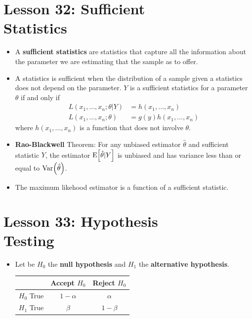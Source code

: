 \documentclass[10pt, french]{article}
\begin{document}
\begin{multicols*}{3}
\section*{Lesson 32: Sufficient \\ Statistics}
\begin{itemize}[align=left,leftmargin=*]
    \item A \textbf{sufficient statistics} are statistics that capture all the information about the parameter we are estimating that the sample as to offer.
    \item A statistics is sufficient when the distribution of a sample given a statistics does not depend on the parameter. $Y$ is a sufficient statistics for a parameter $\theta$ if and only if
    \begin{align*}
        L(x_1,...,x_n;\theta|Y) &= h(x_1,...,x_n) \\
        L(x_1,...,x_n;\theta)&= g(y)h(x_1,...,x_n)
    \end{align*}
    where $h(x_1,...,x_n)$ is a function that does not involve $\theta$.
    \item \textbf{Rao-Blackwell} Theorem: For any unbiased estimator $\hat{\theta}$ and sufficient statistic $Y$, the estimator $\mathrm{E} {\left[ \hat{\theta}|Y \right]}$ is unbiased and has variance less than or equal to $\mathrm{Var} {\left( \hat{\theta} \right)}$.
    \item The maximum likehood estimator is a function of a sufficient statistic.
\end{itemize}

\section*{Lesson 33: Hypothesis \\ Testing}
\begin{itemize}[align=left,leftmargin=*]
  \item
  \begin{flushleft}
    Let be $H_0$ the \textbf{null hypothesis} and $H_1$ the \textbf{alternative hypothesis}.
  \end{flushleft}
  \begin{tabular}{ccc}
    \hline
    & Accept $H_0$ & Reject $H_0$ \\
    \hline
    $H_0$ True &  $1 - \alpha$ & $\alpha$ \\
    $H_1$ True & $\beta$ & $1-\beta$ \\
    \hline
  \end{tabular}

\end{itemize}
\end{multicols*}
\end{document}
